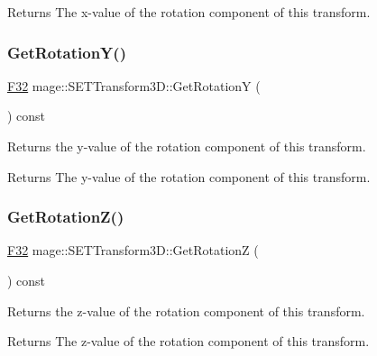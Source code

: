 \begin{DoxyReturn}{Returns}
The x-\/value of the rotation component of this transform. 
\end{DoxyReturn}
\mbox{\label{classmage_1_1_s_e_t_transform3_d_a7e9461b62fc90558c04777e3872e7512}} 
\subsubsection{\texorpdfstring{Get\+Rotation\+Y()}{GetRotationY()}}
{\footnotesize\ttfamily \mbox{\hyperlink{namespacemage_aa97e833b45f06d60a0a9c4fc22ae02c0}{F32}} mage\+::\+S\+E\+T\+Transform3\+D\+::\+Get\+RotationY (\begin{DoxyParamCaption}{ }\end{DoxyParamCaption}) const\hspace{0.3cm}{\ttfamily [noexcept]}}

Returns the y-\/value of the rotation component of this transform.

\begin{DoxyReturn}{Returns}
The y-\/value of the rotation component of this transform. 
\end{DoxyReturn}
\mbox{\label{classmage_1_1_s_e_t_transform3_d_a6aa3d62b58c61461eeadcab1f7129f85}} 
\subsubsection{\texorpdfstring{Get\+Rotation\+Z()}{GetRotationZ()}}
{\footnotesize\ttfamily \mbox{\hyperlink{namespacemage_aa97e833b45f06d60a0a9c4fc22ae02c0}{F32}} mage\+::\+S\+E\+T\+Transform3\+D\+::\+Get\+RotationZ (\begin{DoxyParamCaption}{ }\end{DoxyParamCaption}) const\hspace{0.3cm}{\ttfamily [noexcept]}}

Returns the z-\/value of the rotation component of this transform.

\begin{DoxyReturn}{Returns}
The z-\/value of the rotation component of this transform. 
\end{DoxyReturn}
\mbox{\label{classmage_1_1_s_e_t_transform3_d_a305163d41378fe39b2b7bdbf6e698ffe}} 
